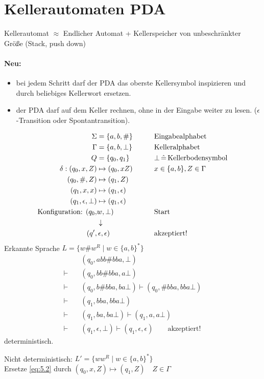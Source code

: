 \section[Kellerautomaten (\acs*{PDA})]{Kellerautomaten \quad\normalfont\normalsize \acf{PDA}}
Kellerautomat $\approx$ Endlicher Automat + Kellerspeicher von unbeschränkter Größe (Stack, push down)
\paragraph*{Neu:}
\begin{itemize}
	\item bei jedem Schritt darf der \ac{PDA} das oberste Kellersymbol inspizieren und durch beliebiges Kellerwort ersetzen.
	\item der \ac{PDA} darf auf dem Keller rechnen, ohne in der Eingabe weiter zu lesen. ($\epsilon$-Transition oder Spontantransition).
\end{itemize}
\begin{Bsp}
	\begin{align}
		\Sigma &= \{a,b,\#\} &\qquad&\text{Eingabealphabet} \notag\\
		\Gamma &= \{a,b,\bot\} &&\text{Kelleralphabet} \notag\\
		Q &= \{q_0,q_1\} &&\bot\,\hat=\,\text{Kellerbodensymbol} \notag\\
		\delta: (q_0,x,Z) &\mapsto (q_0,xZ) && x\in\{a,b\},Z\in\Gamma\\
		(q_0,\#,Z) &\mapsto (q_1,Z) \label{eq:5.2}\\
		(q_1,x,x) &\mapsto (q_1,\epsilon)\\
		(q_1,\epsilon,\bot) &\mapsto (q_1,\epsilon)\\
		\text{Konfiguration: } (q_0,&w,\bot) &&\text{Start}\\
		&\downarrow\\
		(q',&\,\epsilon,\epsilon) &&\text{akzeptiert!}
	\end{align}
	Erkannte Sprache $L=\{w \# w^R \mid w\in\{a,b\}^*\}$
	\begin{align*}
		&(q_0,abb\#bba,\bot)\\
		\vdash\quad &(q_0, bb\#bba, a\bot)\\
		\vdash\quad &(q_0, b\#bba, ba\bot) \vdash (q_0, \#bba, bba\bot)\\
		\vdash\quad &(q_1, bba, bba\bot)\\
		\vdash\quad &(q_1, ba, ba\bot) \vdash (q_1, a, a\bot)\\
		\vdash\quad &(q_1, \epsilon, \bot) \vdash (q_1,\epsilon,\epsilon) \qquad\text{akzeptiert!}
	\end{align*}
	deterministisch.
\end{Bsp}
Nicht deterministisch: $L'=\{ww^R \mid w\in \{a,b\}^*\}$\\
Ersetze \eqref{eq:5.2} durch $(q_0,x,Z) \mapsto (q_1,Z) \quad Z\in\Gamma$

